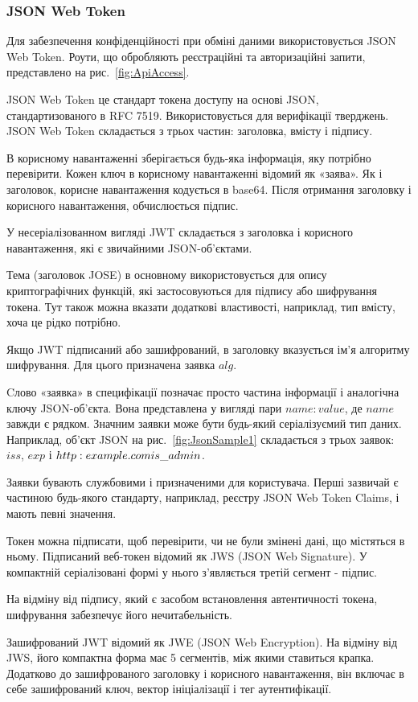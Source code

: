 \subsubsection{JSON Web Token} \label{subsubsection:jwt}


Для забезпечення конфіденційності при обміні даними використовується JSON Web Token. Роути, що обробляють реєстраційні та авторизаційні запити, представлено на рис.~\ref{fig:ApiAccess}.

JSON Web Token це стандарт токена доступу на основі JSON, стандартизованого в RFC 7519. Використовується для верифікації тверджень. JSON Web Token складається з трьох частин: заголовка, вмісту і підпису.

В корисному навантаженні зберігається будь-яка інформація, яку потрібно перевірити. Кожен ключ в корисному навантаженні відомий як «заява». Як і заголовок, корисне навантаження кодується в base64. Після отримання заголовку і корисного навантаження, обчислюється підпис.

У несеріалізованном вигляді JWT складається з заголовка і корисного навантаження, які є звичайними JSON-об'єктами.

Тема (заголовок JOSE) в основному використовується для опису криптографічних функцій, які застосовуються для підпису або шифрування токена. Тут також можна вказати додаткові властивості, наприклад, тип вмісту, хоча це рідко потрібно.

Якщо JWT підписаний або зашифрований, в заголовку вказується ім'я алгоритму шифрування. Для цього призначена заявка $alg$.

Cлово «заявка» в специфікації позначає просто частина інформації і аналогічна ключу JSON-об'єкта. Вона представлена у вигляді пари $name: value$, де $name$ завжди є рядком. Значним заявки може бути будь-який серіалізуємий тип даних. Наприклад, об'єкт JSON на рис.~\ref{fig:JsonSample1} складається з трьох заявок: $iss$, $exp$ і $http:\/\/example.com\/is\_admin$.


Заявки бувають службовими і призначеними для користувача. Перші зазвичай є частиною будь-якого стандарту, наприклад, реєстру JSON Web Token Claims, і мають певні значення.

Токен можна підписати, щоб перевірити, чи не були змінені дані, що містяться в ньому. Підписаний веб-токен відомий як JWS (JSON Web Signature). У компактній серіалізовані формі у нього з'являється третій сегмент - підпис.

На відміну від підпису, який є засобом встановлення автентичності токена, шифрування забезпечує його нечитабельність.

Зашифрований JWT відомий як JWE (JSON Web Encryption). На відміну від JWS, його компактна форма має 5 сегментів, між якими ставиться крапка. Додатково до зашифрованого заголовку і корисного навантаження, він включає в себе зашифрований ключ, вектор ініціалізації і тег аутентифікації.
